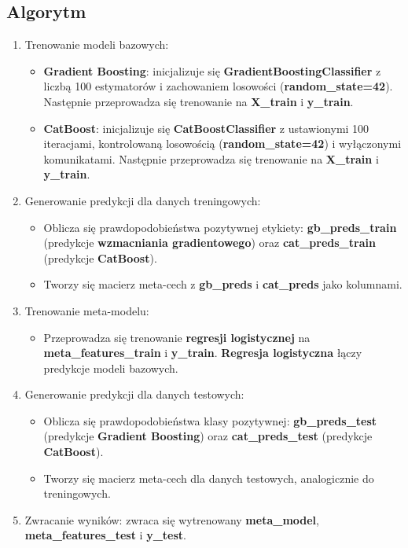 \subsection{Algorytm}
\begin{enumerate}
	\def\labelenumi{\arabic{enumi}.}
	\item
	      Trenowanie modeli bazowych:
	      \begin{itemize}
		      \item
		            \textbf{Gradient Boosting}: inicjalizuje się \textbf{GradientBoostingClassifier} z liczbą 100 estymatorów i zachowaniem losowości (\textbf{random\_state=42}). Następnie przeprowadza się trenowanie na \textbf{X\_train} i \textbf{y\_train}.
		      \item
		            \textbf{CatBoost}: inicjalizuje się \textbf{CatBoostClassifier} z ustawionymi 100 iteracjami, kontrolowaną losowością (\textbf{random\_state=42}) i wyłączonymi komunikatami. Następnie przeprowadza się trenowanie na \textbf{X\_train} i \textbf{y\_train}.
	      \end{itemize}
	\item
	      Generowanie predykcji dla danych treningowych:
	      \begin{itemize}
		      \item
		            Oblicza się prawdopodobieństwa pozytywnej etykiety: \textbf{gb\_preds\_train} (predykcje \textbf{wzmacniania gradientowego}) oraz \textbf{cat\_preds\_train} (predykcje \textbf{CatBoost}).
		      \item
		            Tworzy się macierz meta-cech z \textbf{gb\_preds} i \textbf{cat\_preds} jako kolumnami.
	      \end{itemize}
	\item
	      Trenowanie meta-modelu:
	      \begin{itemize}
		      \item
		            Przeprowadza się trenowanie \textbf{regresji logistycznej} na \textbf{meta\_features\_train} i \textbf{y\_train}. \textbf{Regresja logistyczna} łączy predykcje modeli bazowych.
	      \end{itemize}
	\item
	      Generowanie predykcji dla danych testowych:
	      \begin{itemize}
		      \item
		            Oblicza się prawdopodobieństwa klasy pozytywnej: \textbf{gb\_preds\_test} (predykcje \textbf{Gradient Boosting}) oraz \textbf{cat\_preds\_test} (predykcje \textbf{CatBoost}).
		      \item
		            Tworzy się macierz meta-cech dla danych testowych, analogicznie do treningowych.
	      \end{itemize}
	\item
	      Zwracanie wyników: zwraca się wytrenowany \textbf{meta\_model}, \textbf{meta\_features\_test} i \textbf{y\_test}.
\end{enumerate}

